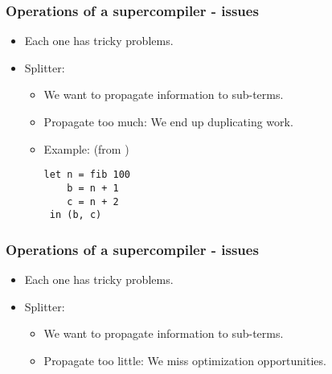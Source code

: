 \documentclass{beamer}
\begin{document}
\begin{frame}[fragile]
    \frametitle{Operations of a supercompiler - issues}

    \begin{itemize}[<+->]
        \item[] Each one has tricky problems.
        \item[] Splitter:
            \begin{itemize}[<+->]
                \item
                    We want to propagate information to sub-terms.
                \item
                    Propagate too much: We end up duplicating work.
                \item
                    Example: (from \citet{callbyneed-sc})
                    \begin{verbatim}
let n = fib 100
    b = n + 1
    c = n + 2
 in (b, c)
                    \end{verbatim}
            \end{itemize}
    \end{itemize}

\end{frame}

\begin{frame}[fragile]
    \frametitle{Operations of a supercompiler - issues}

    \begin{itemize}
        \item[] Each one has tricky problems.
        \item[] Splitter:
            \begin{itemize}
                \item
                    We want to propagate information to sub-terms.
                \item
                    Propagate too little: We miss optimization opportunities.
            \end{itemize}
    \end{itemize}

\end{frame}
\end{document}
